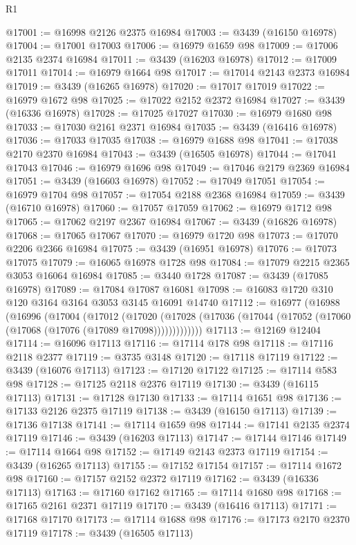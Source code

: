 \begin{lexlean}{R1}
\begin{coremodule}
@17001 := @16998 @2126 @2375 @16984
@17003 := @3439 (@16150 @16978)
@17004 := @17001 @17003
@17006 := @16979 @1659 @98
@17009 := @17006 @2135 @2374 @16984
@17011 := @3439 (@16203 @16978)
@17012 := @17009 @17011
@17014 := @16979 @1664 @98
@17017 := @17014 @2143 @2373 @16984
@17019 := @3439 (@16265 @16978)
@17020 := @17017 @17019
@17022 := @16979 @1672 @98
@17025 := @17022 @2152 @2372 @16984
@17027 := @3439 (@16336 @16978)
@17028 := @17025 @17027
@17030 := @16979 @1680 @98
@17033 := @17030 @2161 @2371 @16984
@17035 := @3439 (@16416 @16978)
@17036 := @17033 @17035
@17038 := @16979 @1688 @98
@17041 := @17038 @2170 @2370 @16984
@17043 := @3439 (@16505 @16978)
@17044 := @17041 @17043
@17046 := @16979 @1696 @98
@17049 := @17046 @2179 @2369 @16984
@17051 := @3439 (@16603 @16978)
@17052 := @17049 @17051
@17054 := @16979 @1704 @98
@17057 := @17054 @2188 @2368 @16984
@17059 := @3439 (@16710 @16978)
@17060 := @17057 @17059
@17062 := @16979 @1712 @98
@17065 := @17062 @2197 @2367 @16984
@17067 := @3439 (@16826 @16978)
@17068 := @17065 @17067
@17070 := @16979 @1720 @98
@17073 := @17070 @2206 @2366 @16984
@17075 := @3439 (@16951 @16978)
@17076 := @17073 @17075
@17079 := @16065 @16978 @1728 @98
@17084 := @17079 @2215 @2365 @3053 @16064 @16984
@17085 := @3440 @1728
@17087 := @3439 (@17085 @16978)
@17089 := @17084 @17087 @16081
@17098 := @16083 @1720 @310 @120 @3164 @3164 @3053 @3145 @16091 @14740
@17112 := @16977
    (@16988
      (@16996
        (@17004
          (@17012
            (@17020
              (@17028 (@17036 (@17044 (@17052 (@17060 (@17068 (@17076 (@17089 @17098)))))))))))))
@17113 := @12169 @12404
@17114 := @16096 @17113
@17116 := @17114 @178 @98
@17118 := @17116 @2118 @2377
@17119 := @3735 @3148
@17120 := @17118 @17119
@17122 := @3439 (@16076 @17113)
@17123 := @17120 @17122
@17125 := @17114 @583 @98
@17128 := @17125 @2118 @2376 @17119
@17130 := @3439 (@16115 @17113)
@17131 := @17128 @17130
@17133 := @17114 @1651 @98
@17136 := @17133 @2126 @2375 @17119
@17138 := @3439 (@16150 @17113)
@17139 := @17136 @17138
@17141 := @17114 @1659 @98
@17144 := @17141 @2135 @2374 @17119
@17146 := @3439 (@16203 @17113)
@17147 := @17144 @17146
@17149 := @17114 @1664 @98
@17152 := @17149 @2143 @2373 @17119
@17154 := @3439 (@16265 @17113)
@17155 := @17152 @17154
@17157 := @17114 @1672 @98
@17160 := @17157 @2152 @2372 @17119
@17162 := @3439 (@16336 @17113)
@17163 := @17160 @17162
@17165 := @17114 @1680 @98
@17168 := @17165 @2161 @2371 @17119
@17170 := @3439 (@16416 @17113)
@17171 := @17168 @17170
@17173 := @17114 @1688 @98
@17176 := @17173 @2170 @2370 @17119
@17178 := @3439 (@16505 @17113)

\end{coremodule}
\end{lexlean}
